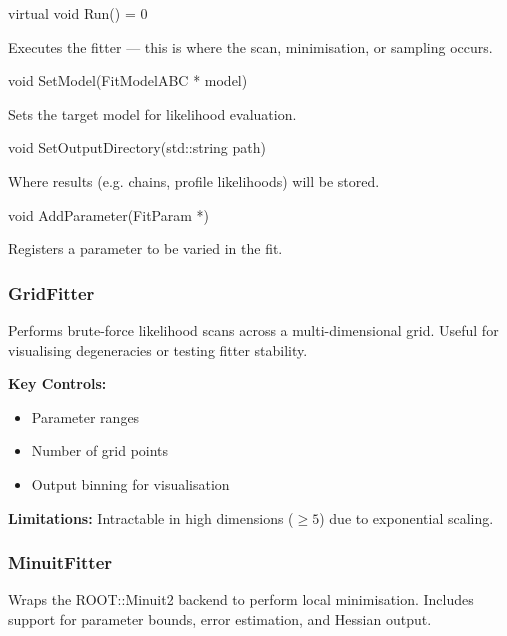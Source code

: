 \begin{description}[align=left]

  \item[] {\color{cadmiumred} virtual void Run() = 0}

  Executes the fitter — this is where the scan, minimisation, or sampling occurs.

  \item[] {\color{cadmiumred} void SetModel(FitModelABC * model)}

  Sets the target model for likelihood evaluation.

  \item[] {\color{cadmiumred} void SetOutputDirectory(std::string path)}

  Where results (e.g. chains, profile likelihoods) will be stored.

  \item[] {\color{cadmiumred} void AddParameter(FitParam *)}

  Registers a parameter to be varied in the fit.

\end{description}

\vspace{1em}
\subsubsection*{\color{cadmiumgreen}\bf GridFitter}

Performs brute-force likelihood scans across a multi-dimensional grid.  
Useful for visualising degeneracies or testing fitter stability.

\noindent\textbf{Key Controls:}
\begin{itemize}
  \item Parameter ranges
  \item Number of grid points
  \item Output binning for visualisation
\end{itemize}

\noindent\textbf{Limitations:}  
Intractable in high dimensions ($\geq 5$) due to exponential scaling.

\vspace{1em}
\subsubsection*{\color{cadmiumgreen}\bf MinuitFitter}

Wraps the {\color{cadmiumgreen} ROOT::Minuit2} backend to perform local minimisation.  
Includes support for parameter bounds, error estimation, and Hessian output.

